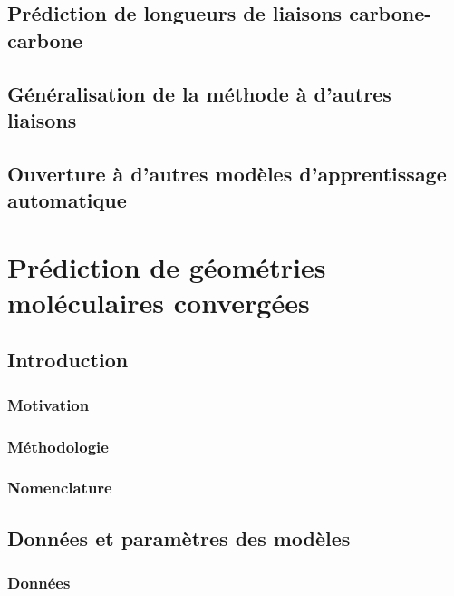 \documentclass{report}
\begin{document}
	\section{Prédiction de longueurs de liaisons carbone-carbone}
		
	\section{Généralisation de la méthode à d'autres liaisons}
		
	\section{Ouverture à d'autres modèles d'apprentissage automatique}
		


\chapter{Prédiction de géométries moléculaires convergées}

	\section{Introduction}
		\subsection{Motivation}
			
		\subsection{Méthodologie}
			
		\subsection{Nomenclature}
			
			
	\section{Données et paramètres des modèles}
		\subsection{Données}
			
\end{document}

